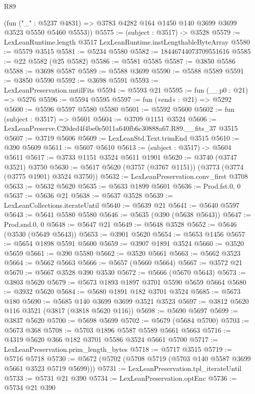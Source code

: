 \begin{lexlean}{R89}
\begin{coremodule}
      (fun ("_" : @5237 @4831) => @3783 @4282 @164 @1450 @140 @3699 @3699 @3523 @5550 @5460 @5553))
@5575 := (subject : @3517) -> @3528
@5579 := LexLeanRuntime.length @3517 LexLeanRuntime.instLengthableByteArray
@5580 := @5579 @3515
@5581 := @5234 @5580
@5582 := 18446744073709551616
@5585 := @22 @5582 (@25 @5582)
@5586 := @5581 @5585
@5587 := @3850 @5586
@5588 := @3698 @5587
@5589 := @5588 @3699
@5590 := @5588 @5589
@5591 := @3850 @5590
@5592 := @3698 @5591
@5593 := LexLeanPreservation.untilFits
@5594 := @5593 @21
@5595 := fun (__p0 : @21) => @5276
@5596 := @5594 @5595
@5597 := fun («end» : @21) => @5292
@5600 := @5596 @5597 @5580 @5580
@5601 := @5592 @5600
@5602 := fun (subject : @3517) => @5601
@5604 := @3709 @1151 @3524
@5606 := LexLeanPreserve.C20ded4f4be0e5011a640fb6c30888a67.R89.__fits_37 @3515
@5607 := @3719 @5606
@5609 := LexLeanStd.Text.trimEnd @3515
@5610 := @390 @5609
@5611 := @5607 @5610
@5613 := (subject : @3517) -> @5604 @5611
@5617 := @3733 @1151 @3524 @5611 @1901
@5620 := @3740 (@3747 @3521) @3750
@5630 := @5617 @5620 (@3757 (@3767 @1151)) (@3773 (@3774 (@3775 @1901) @3524 @3750))
@5632 := LexLeanPreservation.conv_first @3708
@5633 := @5632 @5620
@5635 := @5633 @1899 @5601
@5636 := Prod.fst.{0, 0}
@5637 := @5636 @21
@5638 := @5637 @3528
@5639 := LexLeanCollections.iterateUntil
@5640 := @5639 @21
@5641 := @5640 @5597
@5643 := @5641 @5580 @5580
@5646 := @5635 (@390 (@5638 @5643))
@5647 := Prod.snd.{0, 0}
@5648 := @5647 @21
@5649 := @5648 @3528
@5652 := @5646 (@3530 (@5649 @5643))
@5653 := @3901 @5620
@5654 := @5653 @1456
@5657 := @5654 @1898 @5591 @5600
@5659 := @3907 @1891 @3524
@5660 := @3520 @5659
@5661 := @390 @5580
@5662 := @3520 @5661
@5663 := @5662 @3523
@5664 := @5662 @5663
@5666 := @5657 (@5660 @5664)
@5667 := @3572 @21
@5670 := @5667 @3528 @390 @3530
@5672 := @5666 (@5670 @5643)
@5673 := @3803 @5620
@5679 := @5673 @1893 @1897 @3701 @5590 @5659 @5664
@5680 := @3932 @5620
@5684 := @5680 @1891 @182 @3701 @3524
@5685 := @5673 @180
@5690 := @5685 @140 @3699 @3699 @3521 @3523
@5697 := @3812 @5620 @116 @3521 (@3817 (@3818 @5620 @116))
@5698 := @5690 @5697
@5699 := @3837 @5620
@5700 := @5698 @5699
@5702 := @5679 (@5684 @5700)
@5703 := @5673 @368
@5708 := @5703 @1896 @5587 @5589 @5661 @5663
@5716 := @4319 @5620 @366 @182 @3701 @5586 @3524 @5661 @5700
@5717 := LexLeanPreservation.prim_length_bytes
@5718 := @5717 @3515
@5719 := @5716 @5718
@5730 := @5672 (@5702 (@5708 @5719 (@5703 @140 @5587 @3699 @5661 @3523 @5719 @5699)))
@5731 := LexLeanPreservation.tpl_iterateUntil
@5733 := @5731 @21 @390
@5734 := LexLeanPreservation.optEnc
@5736 := @5734 @21 @390

\end{coremodule}
\end{lexlean}
